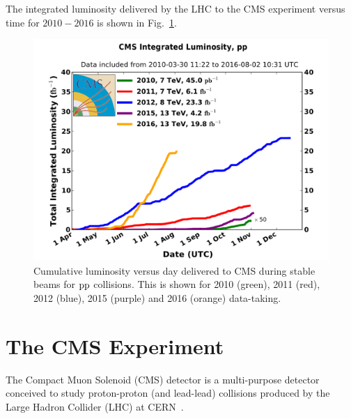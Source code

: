 The integrated luminosity delivered by the LHC to the CMS experiment
versus time for $2010-2016$ is shown in Fig.~\ref{fig:IntLumi20102016}.

\begin{figure}\centering
\includegraphics[width=.9\textwidth]{figs/cms/int_lumi_cumulative_pp_2.pdf}
\caption{Cumulative luminosity versus day delivered to CMS during
  stable beams for $\mathrm{p}\mathrm{p}$  collisions. This is shown for 2010 (green), 2011
  (red), 2012 (blue), 2015 (purple) and 2016 (orange)
  data-taking.\label{fig:IntLumi20102016}}
\end{figure}


\chapter{The CMS Experiment}
\label{ch:cms}
The Compact Muon Solenoid (CMS) detector is a multi-purpose detector
conceived to study proton-proton (and lead-lead) collisions produced
by the Large Hadron Collider (LHC) at CERN~\cite{Adolphi:2008zzk}.

